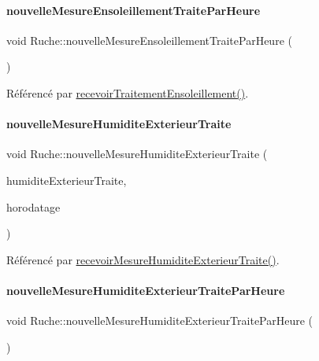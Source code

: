 \paragraph{\texorpdfstring{nouvelle\+Mesure\+Ensoleillement\+Traite\+Par\+Heure}{nouvelleMesureEnsoleillementTraiteParHeure}}
{\footnotesize\ttfamily void Ruche\+::nouvelle\+Mesure\+Ensoleillement\+Traite\+Par\+Heure (\begin{DoxyParamCaption}{ }\end{DoxyParamCaption})\hspace{0.3cm}{\ttfamily [signal]}}



Référencé par \hyperlink{class_ruche_a2ac5766ce8652084f034c498691488ea}{recevoir\+Traitement\+Ensoleillement()}.

\mbox{\label{class_ruche_a9dc15aec6973ca8f565960a51f7f0a6b}} 
\paragraph{\texorpdfstring{nouvelle\+Mesure\+Humidite\+Exterieur\+Traite}{nouvelleMesureHumiditeExterieurTraite}}
{\footnotesize\ttfamily void Ruche\+::nouvelle\+Mesure\+Humidite\+Exterieur\+Traite (\begin{DoxyParamCaption}\item[{double}]{humidite\+Exterieur\+Traite,  }\item[{Q\+String}]{horodatage }\end{DoxyParamCaption})\hspace{0.3cm}{\ttfamily [signal]}}



Référencé par \hyperlink{class_ruche_a2d19d8438eae55c1d76691398087f079}{recevoir\+Mesure\+Humidite\+Exterieur\+Traite()}.

\mbox{\label{class_ruche_aab1ad40a46ab5fe4352a23e4a986856b}} 
\paragraph{\texorpdfstring{nouvelle\+Mesure\+Humidite\+Exterieur\+Traite\+Par\+Heure}{nouvelleMesureHumiditeExterieurTraiteParHeure}}
{\footnotesize\ttfamily void Ruche\+::nouvelle\+Mesure\+Humidite\+Exterieur\+Traite\+Par\+Heure (\begin{DoxyParamCaption}{ }\end{DoxyParamCaption})\hspace{0.3cm}{\ttfamily [signal]}}



